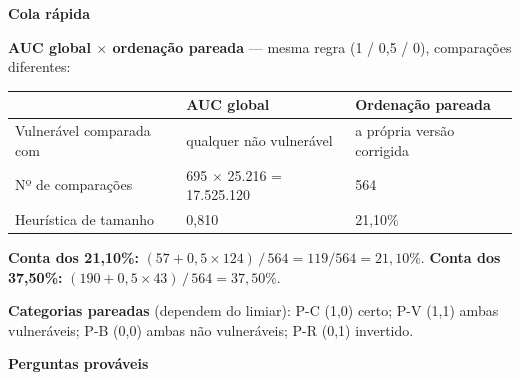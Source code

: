 \documentclass[11pt,a4paper]{article}
\begin{document}
\newpage

{\Large\bfseries Cola rápida}

\vspace{4pt}
\textbf{AUC global $\times$ ordenação pareada} --- mesma regra (1 / 0,5 / 0), comparações diferentes:

\begin{tabular}{@{}lll@{}}
\toprule
 & AUC global & Ordenação pareada \\
\midrule
Vulnerável comparada com & qualquer não vulnerável & a própria versão corrigida \\
Nº de comparações & 695 $\times$ 25.216 = 17.525.120 & 564 \\
Heurística de tamanho & 0,810 & 21,10\% \\
\bottomrule
\end{tabular}

\vspace{4pt}
\textbf{Conta dos 21,10\%:} $(57 + 0{,}5 \times 124)\,/\,564 = 119/564 = 21{,}10\%$. \quad
\textbf{Conta dos 37,50\%:} $(190 + 0{,}5 \times 43)\,/\,564 = 37{,}50\%$.

\textbf{Categorias pareadas} (dependem do limiar): P-C (1,0) certo; P-V (1,1) ambas vulneráveis; P-B (0,0) ambas não vulneráveis; P-R (0,1) invertido.

\vspace{6pt}
{\Large\bfseries Perguntas prováveis}
\end{document}
